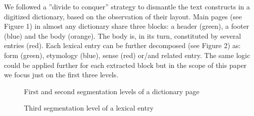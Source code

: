 \documentclass[twocolumn,a4paper]{article}
\begin{document}
 We followed a ”divide to conquer” strategy to dismantle the text constructs in a digitized dictionary, based on the observation of their layout. Main pages (see Figure 1) in almost any dictionary share three blocks: a header (green), a footer (blue) and the body (orange). 
The body is, in its turn, constituted by several entries (red). Each lexical entry can be further decomposed (see Figure 2) as: form (green), etymology (blue), sense (red) or/and related entry. The same logic could be applied further for each extracted block but in the scope of this paper we focus just on the first three levels.
 \begin{figure}
\caption{First and second segmentation levels of a dictionary page~\cite{larousse1975france}\label{fig:mouseover}}
\end{figure}
\begin{figure}
\caption{Third segmentation level of a lexical entry~\cite{larousse1975france}\label{fig:mouseover}}
\end{figure}  
 
\end{document}
